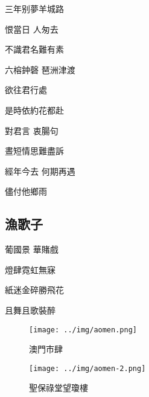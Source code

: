 \documentclass[a4j,12pt]{ltjtarticle}
\begin{document}
\begin{center}
	\vfill
	\LARGE 三年别夢羊城路\par 恨當日 人匆去 \par 不識君名難有素 \par 六榕鈡磬 琶洲津渡 \par 欲往君行處 \par \vfill
	是時依約花都赴\par 對君言 衷腸句 \par 晝短情思難盡訴 \par 經年今去 何期再遇 \par 儘付他鄉雨
	\vspace{1.5cm} %
	\vfill

	\newpage
	\begin{flushleft}
		\section{漁歌子}
	\end{flushleft}

	\vfill
	\LARGE 葡國景 華賭戲\par  
	燈肆霓虹無寐\par
	紙迷金碎勝飛花\par
	且舞且歌裝醉\par
	\vspace{1.5cm} %
	\vfill

	\newpage
	\vfill
	\begin{figure}[h!]
		\centering
		\texttt{[image: ../img/aomen.png]}
		\caption{澳門市肆}
		\label{fig:aomen}
	\end{figure}
	\vfill

	\vfill
	\begin{figure}[h!]
		\centering
		\texttt{[image: ../img/aomen-2.png]}
		\caption{聖保祿堂望瓊樓}
		\label{fig:aomen2}
	\end{figure}
	\vfill

	\end{center}


	
\end{document}
